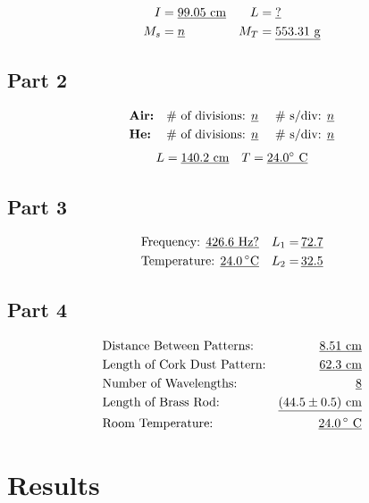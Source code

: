 \documentclass[twocolumn,english]{IEEEtran}
\theoremstyle{plain}
\theoremstyle{plain}
\begin{document}
  \begin{align*}
   I   &= \text{\underline{$99.05$ cm}}	&	L&= \text{\underline{$?$}} \\
   M_s &= \text{\underline{$n$}} 	&	M_T&= \text{\underline{$553.31$ g}}
  \end{align*}

  \subsection*{\textbf{Part 2}}
  \begin{align*}
   &\text{\textbf{Air:}}	&\text{\# of divisions: \underline{$n$} }	& &\text{\# s/div: \underline{$n$}} \\
   &\text{\textbf{He:}}		&\text{\# of divisions: \underline{$n$} }	& &\text{\# s/div: \underline{$n$}}
  \end{align*}
  \begin{align*}
   &L = \text{\underline{$140.2$ cm}}	&T = \text{\underline{$24.0^{\circ}$ C}}
  \end{align*}


  \subsection*{\textbf{Part 3}}
  \begin{align*}
   &\text{Frequency: \underline{$426.6$ Hz?}} 			&\text{$L_1 =\,$\underline{$72.7$}} \\
   &\text{Temperature: \underline{$24.0\,^{\circ}$C}}		&\text{$L_2 =\,$\underline{$32.5$}}
  \end{align*}

  \subsection*{\textbf{Part 4}}
  \begin{align*}
   &\text{Distance Between Patterns:} 	&\text{\underline{$8.51$ cm}} \\
   &\text{Length of Cork Dust Pattern:} &\text{\underline{$62.3$ cm}} \\
   &\text{Number of Wavelengths:} 	&\text{\underline{$8$}} \\
   &\text{Length of Brass Rod:} 	&\text{\underline{$(44.5\pm0.5)$ cm}} \\
   &\text{Room Temperature:} 		&\text{\underline{$24.0\,^{\circ}$ C}}
  \end{align*}

\section{Results}
\end{document}
